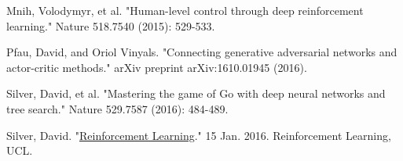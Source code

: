 \documentclass{article}
\begin{document}
\begin{thebibliography}{9}


Mnih, Volodymyr, et al. "Human-level control through deep reinforcement learning." Nature 518.7540 (2015): 529-533.

Pfau, David, and Oriol Vinyals. "Connecting generative adversarial networks and actor-critic methods." arXiv preprint arXiv:1610.01945 (2016).

Silver, David, et al. "Mastering the game of Go with deep neural networks and tree search." Nature 529.7587 (2016): 484-489.

Silver, David. "\href{http://www0.cs.ucl.ac.uk/staff/d.silver/web/Teaching_files/intro_RL.pdf}{Reinforcement Learning}." 15 Jan. 2016. Reinforcement Learning, UCL.

\end{thebibliography}
\end{document}
